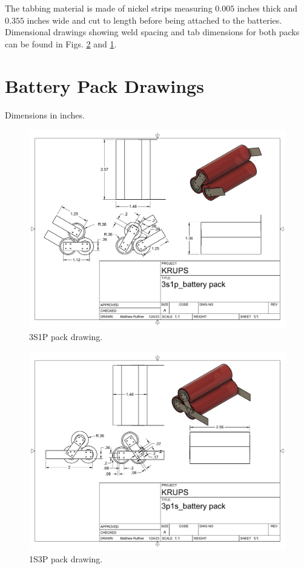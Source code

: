 \documentclass{article}
\begin{document}
The tabbing material is made of nickel strips measuring $0.005$ inches thick and $0.355$ inches wide and cut to length before being attached to the batteries. Dimensional drawings showing weld spacing and tab dimensions for both packs can be found in Figs. \ref{fig:1s3p_drawing} and \ref{fig:3s1p_drawing}.

\appendix

\section{Battery Pack Drawings}
Dimensions in inches.
\begin{figure}
\centering
\includegraphics[width=\textwidth]{images/3s1p_battery pack Drawing v2.pdf}
\caption{3S1P pack drawing.}
\label{fig:3s1p_drawing}
\end{figure}

\begin{figure}
\centering
\includegraphics[width=\textwidth]{images/3p1s_battery pack Drawing v0.pdf}
\caption{1S3P pack drawing.}
\label{fig:1s3p_drawing}
\end{figure}
\end{document}
